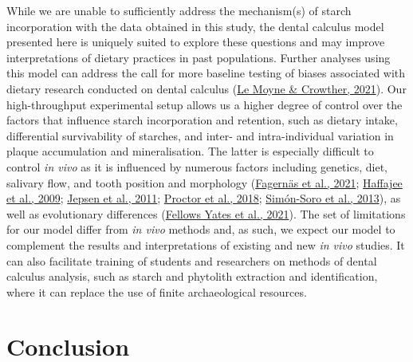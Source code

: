 \documentclass[
  b5paper,
]{book}
\begin{document}
While we are unable to sufficiently address the mechanism(s) of starch
incorporation with the data obtained in this study, the dental calculus
model presented here is uniquely suited to explore these questions and
may improve interpretations of dietary practices in past populations.
Further analyses using this model can address the call for more baseline
testing of biases associated with dietary research conducted on dental
calculus (\protect\hyperlink{ref-lemoyneCalculusPretreatments2021}{Le
Moyne \& Crowther, 2021}). Our high-throughput experimental setup allows
us a higher degree of control over the factors that influence starch
incorporation and retention, such as dietary intake, differential
survivability of starches, and inter- and intra-individual variation in
plaque accumulation and mineralisation. The latter is especially
difficult to control \emph{in vivo} as it is influenced by numerous
factors including genetics, diet, salivary flow, and tooth position and
morphology
(\protect\hyperlink{ref-fagernasMicrobialBiogeography2021}{Fagernäs et
al., 2021}; \protect\hyperlink{ref-haffajeeBiofilmPosition2009}{Haffajee
et al., 2009}; \protect\hyperlink{ref-jepsenCalculusRemoval2011}{Jepsen
et al., 2011};
\protect\hyperlink{ref-proctorSpatialGradient2018}{Proctor et al.,
2018}; \protect\hyperlink{ref-simonsoroOralGeography2013}{Simón-Soro et
al., 2013}), as well as evolutionary differences
(\protect\hyperlink{ref-yatesOralMicrobiome2021}{Fellows Yates et al.,
2021}). The set of limitations for our model differ from \emph{in vivo}
methods and, as such, we expect our model to complement the results and
interpretations of existing and new \emph{in vivo} studies. It can also
facilitate training of students and researchers on methods of dental
calculus analysis, such as starch and phytolith extraction and
identification, where it can replace the use of finite archaeological
resources.

\hypertarget{conclusion}{%
\section{Conclusion}\label{conclusion}}
\end{document}

